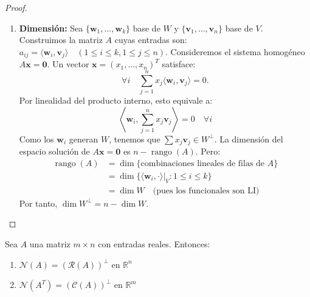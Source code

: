 \begin{proof}
\begin{enumerate}
    \item \textbf{Dimensión:} Sea $\{\mathbf{w}_1, \dots, \mathbf{w}_k\}$ base de $W$ y $\{\mathbf{v}_1, \dots, \mathbf{v}_n\}$ base de $V$. Construimos la matriz $A$ cuyas entradas son: \(
a_{ij} = \langle \mathbf{w}_i, \mathbf{v}_j \rangle \quad (1 \leq i \leq k, 1 \leq j \leq n).\) Consideremos el sistema homogéneo $A\mathbf{x} = \mathbf{0}$. Un vector $\mathbf{x} = (x_1, \dots, x_n)^T$ satisface:
\[ \forall i \quad
\sum_{j=1}^n x_j \langle \mathbf{w}_i, \mathbf{v}_j \rangle = 0.
\]
Por linealidad del producto interno, esto equivale a:
\[
\left\langle \mathbf{w}_i, \sum_{j=1}^n x_j \mathbf{v}_j \right\rangle = 0 \quad \forall i
\]
Como los $\mathbf{w}_i$ generan $W$, tenemos que $\sum x_j \mathbf{v}_j \in W^\perp$.  La dimensión del espacio solución de $A\mathbf{x} = \mathbf{0}$ es $n - \operatorname{rango}(A)$. Pero:
\begin{align*}
\operatorname{rango}(A) &= \dim \{\text{combinaciones lineales de filas de } A\} \\
&= \dim \{\langle \mathbf{w}_i, \cdot \rangle |_{V} : 1 \leq i \leq k\} \\
&= \dim W \quad \text{(pues los funcionales son LI)}
\end{align*}
Por tanto, $\dim W^\perp = n - \dim W$.

\end{enumerate}
\end{proof}

\begin{theorem}
Sea $A$ una matriz $m \times n$ con entradas reales. Entonces:
\begin{enumerate}
    \item $\mathcal{N}(A) = (\mathcal{R}(A))^\perp$ en $\mathbb{R}^n$
    \item $\mathcal{N}(A^T) = (\mathcal{C}(A))^\perp$ en $\mathbb{R}^m$
\end{enumerate}
\end{theorem}

